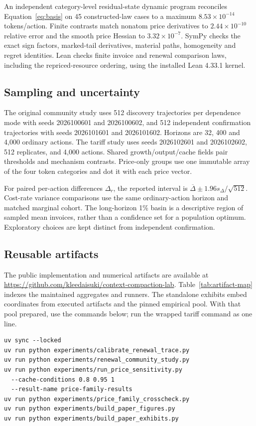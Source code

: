 \documentclass[sigconf,screen,nonacm]{acmart}
\begin{document}
An independent category-level residual-state dynamic program reconciles
Equation~\eqref{eq:basis} on 45 constructed-law cases to a maximum
$8.53\times10^{-14}$ tokens/action. Finite contrasts match nonatom price
derivatives to $2.44\times10^{-10}$ relative error and the smooth price
Hessian to $3.32\times10^{-7}$. SymPy checks the exact sign factors,
marked-tail derivatives, material paths, homogeneity and regret identities.
Lean checks finite invoice and renewal comparison laws, including the
repriced-resource ordering, using the installed Lean 4.33.1 kernel.

\subsection{Sampling and uncertainty}
The original community study uses 512 discovery trajectories per dependence
mode with seeds 2026100601 and 2026100602, and 512 independent confirmation
trajectories with seeds 2026101601 and 2026101602. Horizons are 32, 400 and 4,000
ordinary actions. The tariff study uses seeds 2026102601 and 2026102602, 512
replicates, and 4,000 actions. Shared growth/output/cache fields pair
thresholds and mechanism contrasts. Price-only groups use one immutable
array of the four token categories and dot it with each price vector.

For paired per-action differences $\Delta_r$, the reported interval is
$\overline\Delta\pm1.96s_\Delta/\sqrt{512}$. Cost-rate variance comparisons
use the same ordinary-action horizon and matched marginal cohort. The
long-horizon 1\% basin is a descriptive region of sampled mean invoices,
rather than a confidence set for a population optimum. Exploratory choices
are kept distinct from independent confirmation.

\subsection{Reusable artifacts}
The public implementation and numerical artifacts are available at
\url{https://github.com/kleedaisuki/context-compaction-lab}.
Table~\ref{tab:artifact-map} indexes the maintained aggregates and runners.
The standalone exhibits embed coordinates from executed artifacts and the
pinned empirical pool. With that pool prepared, use the commands below;
run the wrapped tariff command as one line.



\begin{verbatim}
uv sync --locked
uv run python experiments/calibrate_renewal_trace.py
uv run python experiments/renewal_community_study.py
uv run python experiments/run_price_sensitivity.py
  --cache-conditions 0.8 0.95 1
  --result-name price-family-results
uv run python experiments/price_family_crosscheck.py
uv run python experiments/build_paper_figures.py
uv run python experiments/build_paper_exhibits.py
\end{verbatim}
\end{document}

